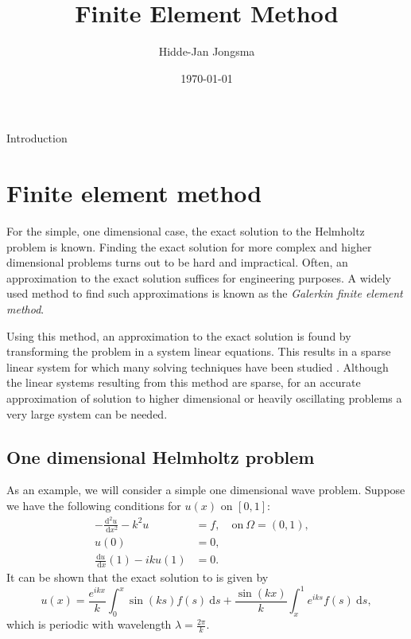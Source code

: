 \documentclass[a4paper]{article}
\author{Hidde-Jan Jongsma}
\title{Finite Element Method}
\date{\today}
\newcommand{\dd}{\mathrm{d}}
\begin{document}
Introduction

\section{Finite element method}

For the simple, one dimensional case, the exact solution to the
Helmholtz problem is known. Finding the exact solution for more
complex and higher dimensional problems turns out to be hard and
impractical.  Often, an approximation to the exact solution suffices
for engineering purposes. A widely used method to find such
approximations is known as the \emph{Galerkin finite element method}.

Using this method, an approximation to the exact solution is found by
transforming the problem in a system linear equations.  This results
in a sparse linear system for which many solving techniques have been
studied \cite{}. Although the linear systems resulting from this
method are sparse, for an accurate approximation of solution to higher
dimensional or heavily oscillating problems a very large system can be
needed.

%

\subsection{One dimensional Helmholtz problem}

As an example, we will consider a simple one dimensional wave problem.
Suppose we have the following conditions for $u(x)$ on $[0, 1]$:
\begin{align}
    - \frac{\dd^2u}{\ \dd x^2} - k^2 u
      & = f, \quad \text{on}\ \Omega = (0, 1), \\
    u(0) & = 0, \label{eq:dirbc} \\
    \frac{\dd u}{\ \dd x}(1) - i k u(1) & = 0. \label{eq:impbc} &
\end{align}
It can be shown that the exact solution to is given by
\begin{equation}
  u(x) = \frac{e^{ikx}}{k} \int^x_0 \sin(ks)f(s) \ \dd s
          + \frac{\sin(kx)}{k} \int^1_x e^{iks} f(s) \ \dd s,
\end{equation}
which is periodic with wavelength $\lambda = \frac{2\pi}{k}$.
\end{document}
